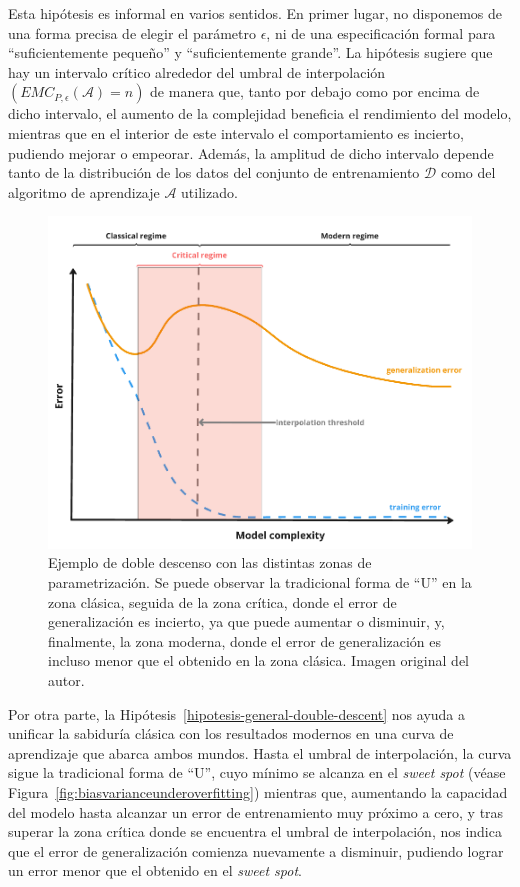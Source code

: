 Esta hipótesis es informal en varios sentidos. En primer lugar, no disponemos de una forma precisa de elegir el parámetro $\epsilon$, ni de una especificación formal para ``suficientemente pequeño'' y ``suficientemente grande''. La hipótesis sugiere que hay un intervalo crítico alrededor del umbral de interpolación $(EMC_{P, \epsilon}(\mathcal{A}) = n)$ de manera que, tanto por debajo como por encima de dicho intervalo, el aumento de la complejidad beneficia el rendimiento del modelo, mientras que en el interior de este intervalo el comportamiento es incierto, pudiendo mejorar o empeorar. Además, la amplitud de dicho intervalo depende tanto de la distribución de los datos del conjunto de entrenamiento $\mathcal{D}$ como del algoritmo de aprendizaje $\mathcal{A}$ utilizado.\newline

\begin{figure}[h]
    \centering
    \includegraphics[width=0.65\linewidth]{img/planteamiento-teorico-dd.png}
    \caption[Ejemplo de doble descenso con las distintas zonas de parametrización.]{Ejemplo de doble descenso con las distintas zonas de parametrización. Se puede observar la tradicional forma de ``U'' en la zona clásica, seguida de la zona crítica, donde el error de generalización es incierto, ya que puede aumentar o disminuir, y, finalmente, la zona moderna, donde el error de generalización es incluso menor que el obtenido en la zona clásica. Imagen original del autor.}\label{fig:planteamiento-teorico-dd.png}
\end{figure}

Por otra parte, la Hipótesis~\ref{hipotesis-general-double-descent} nos ayuda a unificar la sabiduría clásica con los resultados modernos en una curva de aprendizaje que abarca ambos mundos. Hasta el umbral de interpolación, la curva sigue la tradicional forma de ``U'', cuyo mínimo se alcanza en el \textit{sweet spot} (véase Figura~\ref{fig:biasvarianceunderoverfitting}) mientras que, aumentando la capacidad del modelo hasta alcanzar un error de entrenamiento muy próximo a cero, y tras superar la zona crítica donde se encuentra el umbral de interpolación, nos indica que el error de generalización comienza nuevamente a disminuir, pudiendo lograr un error menor que el obtenido en el \textit{sweet spot}.\newline


